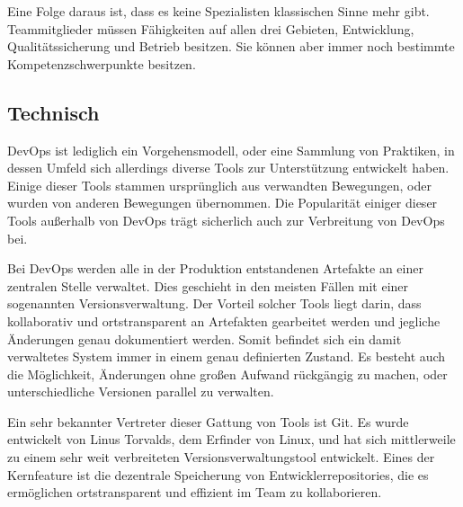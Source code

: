 Eine Folge daraus ist, dass es keine Spezialisten klassischen Sinne mehr gibt. Teammitglieder müssen Fähigkeiten auf allen drei Gebieten, Entwicklung, Qualitätssicherung und Betrieb besitzen. 
Sie können aber immer noch bestimmte Kompetenzschwerpunkte besitzen. \parencite[Vgl.][S. 7]{sacks:2012}

\subsection{Technisch}
DevOps ist lediglich ein Vorgehensmodell, oder eine Sammlung von Praktiken, in dessen Umfeld sich allerdings diverse Tools zur Unterstützung entwickelt haben. 
Einige dieser Tools stammen ursprünglich aus verwandten Bewegungen, oder wurden von anderen Bewegungen übernommen. 
Die Popularität einiger dieser Tools außerhalb von DevOps trägt sicherlich auch zur Verbreitung von DevOps bei.


Bei DevOps werden alle in der Produktion entstandenen Artefakte an einer zentralen Stelle verwaltet. 
Dies geschieht in den meisten Fällen mit einer sogenannten Versionsverwaltung. 
Der Vorteil solcher Tools liegt darin, dass kollaborativ und ortstransparent an Artefakten gearbeitet werden und jegliche Änderungen genau dokumentiert werden. 
Somit befindet sich ein damit verwaltetes System immer in einem genau definierten Zustand. 
Es besteht auch die Möglichkeit, Änderungen ohne großen Aufwand rückgängig zu machen, oder unterschiedliche Versionen parallel zu verwalten.

Ein sehr bekannter Vertreter dieser Gattung von Tools ist Git. 
Es wurde entwickelt von Linus Torvalds, dem Erfinder von Linux, und hat sich mittlerweile zu einem sehr weit verbreiteten Versionsverwaltungstool entwickelt. 
Eines der Kernfeature ist die dezentrale Speicherung von Entwicklerrepositories, die es ermöglichen ortstransparent und effizient im Team zu kollaborieren. 
\parencite[Vgl.][S. 31 ff.]{loeliger:2012}


